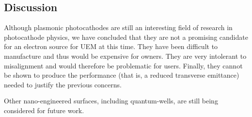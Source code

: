 \subsection{Discussion}

Although plasmonic photocathodes are still an interesting field of research in photocathode physics, we have concluded that they are not a promising candidate for an electron source for UEM at this time.
They have been difficult to manufacture and thus would be expensive for owners.
They are very intolerant to misalignment and would therefore be problematic for users.
Finally, they cannot be shown to produce the performance (that is, a reduced transverse emittance) needed to justify the previous concerns.

Other nano-engineered surfaces, including quantum-wells, are still being considered for future work.

